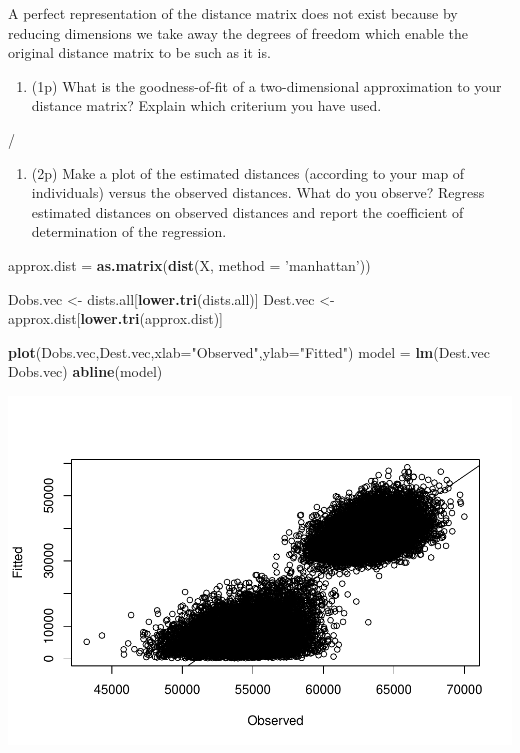 \documentclass[
]{article}
\newenvironment{Shaded}{\begin{snugshade}}{\end{snugshade}}
\newcommand{\DataTypeTok}[1]{\textcolor[rgb]{0.13,0.29,0.53}{#1}}
\newcommand{\KeywordTok}[1]{\textcolor[rgb]{0.13,0.29,0.53}{\textbf{#1}}}
\newcommand{\NormalTok}[1]{#1}
\newcommand{\OperatorTok}[1]{\textcolor[rgb]{0.81,0.36,0.00}{\textbf{#1}}}
\newcommand{\StringTok}[1]{\textcolor[rgb]{0.31,0.60,0.02}{#1}}
\providecommand{\tightlist}{%
  \setlength{\itemsep}{0pt}\setlength{\parskip}{0pt}}
\begin{document}
A perfect representation of the distance matrix does not exist because
by reducing dimensions we take away the degrees of freedom which enable
the original distance matrix to be such as it is.

\begin{enumerate}
\def\labelenumi{\arabic{enumi}.}
\setcounter{enumi}{6}
\tightlist
\item
  (1p) What is the goodness-of-fit of a two-dimensional approximation to
  your distance matrix? Explain which criterium you have used.
\end{enumerate}

/

\begin{enumerate}
\def\labelenumi{\arabic{enumi}.}
\setcounter{enumi}{7}
\tightlist
\item
  (2p) Make a plot of the estimated distances (according to your map of
  individuals) versus the observed distances. What do you observe?
  Regress estimated distances on observed distances and report the
  coefficient of determination of the regression.
\end{enumerate}

\begin{Shaded}
\begin{Highlighting}[]
\NormalTok{approx.dist =}\StringTok{ }\KeywordTok{as.matrix}\NormalTok{(}\KeywordTok{dist}\NormalTok{(X, }\DataTypeTok{method =} \StringTok{'manhattan'}\NormalTok{))}

\NormalTok{Dobs.vec <-}\StringTok{ }\NormalTok{dists.all[}\KeywordTok{lower.tri}\NormalTok{(dists.all)]}
\NormalTok{Dest.vec <-}\StringTok{ }\NormalTok{approx.dist[}\KeywordTok{lower.tri}\NormalTok{(approx.dist)]}

\KeywordTok{plot}\NormalTok{(Dobs.vec,Dest.vec,}\DataTypeTok{xlab=}\StringTok{"Observed"}\NormalTok{,}\DataTypeTok{ylab=}\StringTok{"Fitted"}\NormalTok{)}
\NormalTok{model =}\StringTok{ }\KeywordTok{lm}\NormalTok{(Dest.vec }\OperatorTok{~}\StringTok{ }\NormalTok{Dobs.vec)}
\KeywordTok{abline}\NormalTok{(model)}
\end{Highlighting}
\end{Shaded}

\includegraphics{P052020_Substructure_files/figure-latex/8th-1.pdf}
\end{document}
